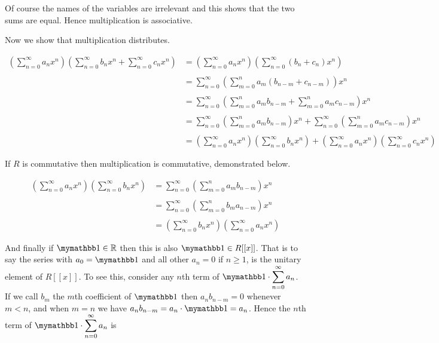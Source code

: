 \documentclass{article}
\begin{document}
  Of course the names of the variables are irrelevant and this shows that the two sums are equal.  Hence multiplication is associative.

  Now we show that multiplication distributes.

  \begin{align*}
    \left(\sum_{n=0}^\infty a_nx^n\right)\left(\sum_{n=0}^\infty b_nx^n+\sum_{n=0}^\infty c_nx^n\right) &= \left(\sum_{n=0}^\infty a_nx^n\right)\left(\sum_{n=0}^\infty (b_n+c_n)x^n\right) \\\\
    &= \sum_{n=0}^\infty \left(\sum_{m=0}^n a_m(b_{n-m}+c_{n-m})\right)x^n \\\\
    &= \sum_{n=0}^\infty \left(\sum_{m=0}^n a_mb_{n-m}+\sum_{m=0}^n a_mc_{n-m}\right)x^n \\\\
    &= \sum_{n=0}^\infty\left(\sum_{m=0}^n a_mb_{n-m}\right)x^n+\sum_{n=0}^\infty\left(\sum_{m=0}^n a_mc_{n-m}\right)x^n \\\\
    &= \left(\sum_{n=0}^\infty a_nx^n\right)\left( \sum_{n=0}^\infty b_nx^n\right) + \left(\sum_{n=0}^\infty a_nx^n\right)\left(\sum_{n=0}^\infty c_nx^n\right)
  \end{align*}

  If $R$ is commutative then multiplication is commutative, demonstrated below.

  \begin{align*}
    \left(\sum_{n=0}^\infty a_nx^n\right)\left(\sum_{n=0}^\infty b_nx^n\right) &= \sum_{n=0}^\infty \left(\sum_{m=0}^n a_m b_{n-m}\right)x^n \\\\
    &= \sum_{n=0}^\infty \left(\sum_{m=0}^n b_ma_{n-m}\right)x^n \\\\
    &= \left(\sum_{n=0}^\infty b_nx^n\right)\left(\sum_{n=0}^\infty a_nx^n\right)
  \end{align*}

  And finally if $\mymathbb 1\in\mathbb R$ then this is also $\mymathbb 1\in R[[x]]$.  That is to say the series with $a_0=\mymathbb 1$ and all other $a_n=0$ if $n\geq 1$, is the unitary element of $R[[x]]$.  To see this, consider any $n$th term of $\displaystyle\mymathbb 1 \cdot \sum_{n=0}^\infty a_n$.  If we call $b_m$ the $m$th coefficient of $\mymathbb 1$ then $a_n b_{n-m}=0$ whenever $m < n$, and when $m=n$ we have $a_nb_{n-m}=a_n\cdot \mymathbb 1 = a_n$.  Hence the $n$th term of $\displaystyle\mymathbb 1 \cdot \sum_{n=0}^\infty a_n$ is
\end{document}
